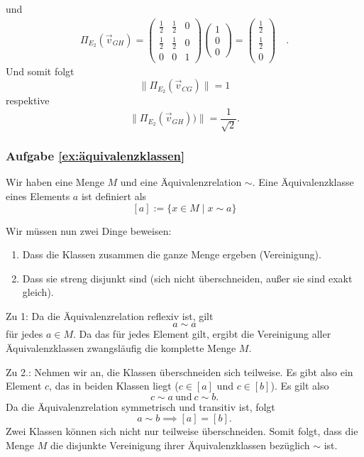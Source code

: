 und 
\begin{align}
    \Pi_{E_2}(\vec{v}_{GH}) = \left(\begin{matrix}
            \frac{1}{2} & \frac{1}{2} & 0 \\[3pt]
            \frac{1}{2} & \frac{1}{2} & 0 \\[3pt]
            0 & 0 & 1
            \end{matrix}\right) \begin{pmatrix} 1 \\ 0 \\ 0 \end{pmatrix} =  \begin{pmatrix} \frac{1}{2} \\[3pt] \frac{1}{2} \\[3pt] 0 \end{pmatrix} \quad . \nonumber
\end{align}
Und somit folgt 
$$ \|\Pi_{E_2}(\vec{v}_{CG})\| = 1 $$ 
respektive
$$ \|\Pi_{E_2}(\vec{v}_{GH}))\| = \frac{1}{\sqrt{2}}.$$ 


\subsubsection*{Aufgabe \ref{ex:äquivalenzklassen}}
Wir haben eine Menge $M$ und eine Äquivalenzrelation $\sim$. Eine Äquivalenzklasse eines Elements $a$ ist definiert als $$[a] := \{x \in M \mid x \sim a\}$$

Wir müssen nun zwei Dinge beweisen:
\begin{enumerate}
    \item Dass die Klassen zusammen die ganze Menge ergeben (Vereinigung).
    \item Dass sie streng disjunkt sind (sich nicht überschneiden, außer sie sind exakt gleich).
\end{enumerate}
\vspace{0.4cm}
Zu 1: Da die Äquivalenzrelation reflexiv ist, gilt $$ a \sim a$$
für jedes $a \in M$. Da das für jedes Element gilt, ergibt die Vereinigung aller Äquivalenzklassen zwangsläufig die komplette Menge $M$.

\vspace{0.4cm}
Zu 2.: Nehmen wir an, die Klassen überschneiden sich teilweise. Es gibt also ein Element $c$, das in beiden Klassen liegt ($c \in [a]$ und $c \in [b]$).  Es gilt also
$$ c \sim a \ \text{und} \ c \sim b.$$
Da die Äquivalenzrelation symmetrisch und transitiv ist, folgt
$$ a \sim b \implies [a] = [b].$$
Zwei Klassen können sich nicht nur teilweise überschneiden. 
\vspace{0.4cm}
Somit folgt, dass die Menge $M$ die disjunkte Vereinigung ihrer Äquivalenzklassen bezüglich $\sim$ ist.

